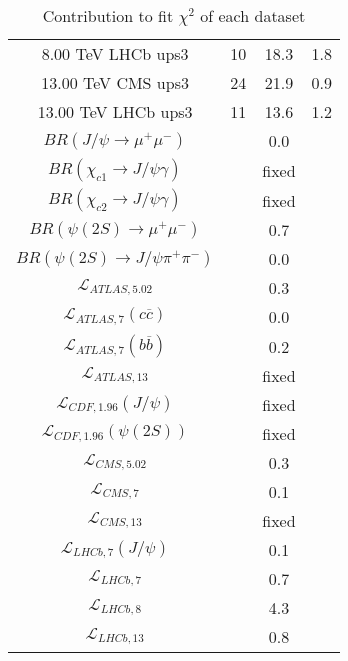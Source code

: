 \begin{table}[h!]
\begin{tabular}{c|c|c|c}
8.00 TeV LHCb ups3 & 10 & 18.3 & 1.8 \\
13.00 TeV CMS ups3 & 24 & 21.9 & 0.9 \\
13.00 TeV LHCb ups3 & 11 & 13.6 & 1.2 \\
\hline
$BR(J/\psi\rightarrow\mu^+\mu^-)$ &  & 0.0 &  \\
$BR(\chi_{c1}\rightarrow J/\psi\gamma)$ &  & fixed & \\
$BR(\chi_{c2}\rightarrow J/\psi\gamma)$ &  & fixed & \\
$BR(\psi(2S)\rightarrow\mu^+\mu^-)$ &  & 0.7 &  \\
$BR(\psi(2S)\rightarrow J/\psi\pi^+\pi^-)$ &  & 0.0 &  \\
$\mathcal L_{ATLAS,5.02}$ &  & 0.3 &  \\
$\mathcal L_{ATLAS,7}(c\overline c)$ &  & 0.0 &  \\
$\mathcal L_{ATLAS,7}(b\overline b)$ &  & 0.2 &  \\
$\mathcal L_{ATLAS,13}$ &  & fixed & \\
$\mathcal L_{CDF,1.96}(J/\psi)$ &  & fixed & \\
$\mathcal L_{CDF,1.96}(\psi(2S))$ &  & fixed & \\
$\mathcal L_{CMS,5.02}$ &  & 0.3 &  \\
$\mathcal L_{CMS,7}$ &  & 0.1 &  \\
$\mathcal L_{CMS,13}$ &  & fixed & \\
$\mathcal L_{LHCb,7}(J/\psi)$ &  & 0.1 &  \\
$\mathcal L_{LHCb,7}$ &  & 0.7 &  \\
$\mathcal L_{LHCb,8}$ &  & 4.3 &  \\
$\mathcal L_{LHCb,13}$ &  & 0.8 &  \\
\end{tabular}
\caption{Contribution to fit $\chi^2$ of each dataset}
\end{table}
